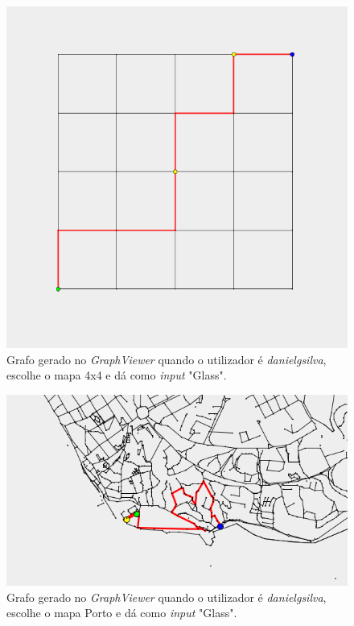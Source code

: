 \documentclass[article, a4paper, 12pt, oneside]{memoir}
\begin{document}
\begin{itemize}
\begin{figure}[h!]
  	\centerline{\includegraphics[scale=0.4]{wasteapp_4x4danielgsilvaglass.png}}
  	\caption{Grafo gerado no \textit{GraphViewer} quando o utilizador é \textit{danielgsilva}, escolhe o mapa 4x4 e dá como \textit{input} "Glass".}
\end{figure}

\begin{figure}[h!]
  \centerline{\includegraphics[scale=0.4]{porto_disconnected.png}}
  \caption{Grafo gerado no \textit{GraphViewer} quando o utilizador é \textit{danielgsilva}, escolhe o mapa Porto e dá como \textit{input} "Glass".}
\end{figure}
	
\end{itemize}
\end{document}
